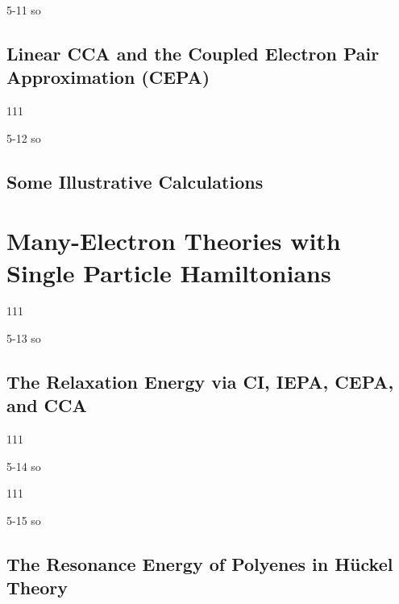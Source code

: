 \documentclass[a4paper]{book}
\begin{document}
	\begin{solution}
		5-11 so
	\end{solution}
	
	\subsection{Linear CCA and the Coupled Electron Pair Approximation (CEPA)}
	
	\begin{exercise}
	111
	\end{exercise}
	
	\begin{solution}
		5-12 so
	\end{solution}
	
	\subsection{Some Illustrative Calculations}
	
	\section{Many-Electron Theories with Single Particle Hamiltonians}
	
	\begin{exercise}
	111
	\end{exercise}
	
	\begin{solution}
		5-13 so
	\end{solution}
	
	\subsection{The Relaxation Energy via CI, IEPA, CEPA, and CCA}
	
	\begin{exercise}
	111
	\end{exercise}
	
	\begin{solution}
		5-14 so
	\end{solution}
	
	\begin{exercise}
	111
	\end{exercise}
	
	\begin{solution}
		5-15 so
	\end{solution}
	
	\subsection{The Resonance Energy of Polyenes in H{\"u}ckel Theory}
	
\end{document}
